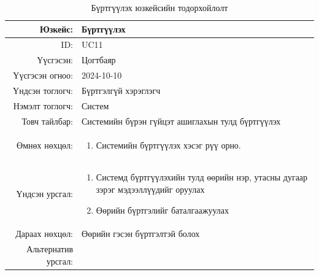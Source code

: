 \begin{longtable}{|r|p{11.5cm}|}
    \caption{Бүртгүүлэх юзкейсийн тодорхойлолт} 
    \label{table:songolt3}\\ \hline
    {Юзкейс:} & {Бүртгүүлэх}\\ \hline
    {ID:} & {UC11}\\ \hline
    {Үүсгэсэн:} & {Цогтбаяр}\\ \hline
    {Үүсгэсэн огноо:} & {2024-10-10}\\ \hline
    {Үндсэн тоглогч:} & {Бүртгэлгүй хэрэглэгч}\\ \hline
    {Нэмэлт тоглогч:} & {Систем}\\ \hline
    {Товч тайлбар:} & {Системийн бүрэн гүйцэт ашиглахын тулд бүртгүүлэх}\\ \hline
    {Өмнөх нөхцөл:} & {\begin{enumerate}
        \item Системийн бүртгүүлэх хэсэг рүү орно.
    \end{enumerate}}\\ \hline
    {Үндсэн урсгал:} & {\begin{enumerate}
        \item Системд бүртгүүлэхийн тулд өөрийн нэр, утасны дугаар зэрэг мэдээллүүдийг оруулах
        \item Өөрийн бүртгэлийг баталгаажуулах
        \end{enumerate}}\\ \hline
    {Дараах нөхцөл:} & {Өөрийн гэсэн бүртгэлтэй болох }\\ \hline
    {Альтернатив урсгал:} & {\begin{enumerate}
    \end{enumerate}}\\ \hline
\end{longtable}
